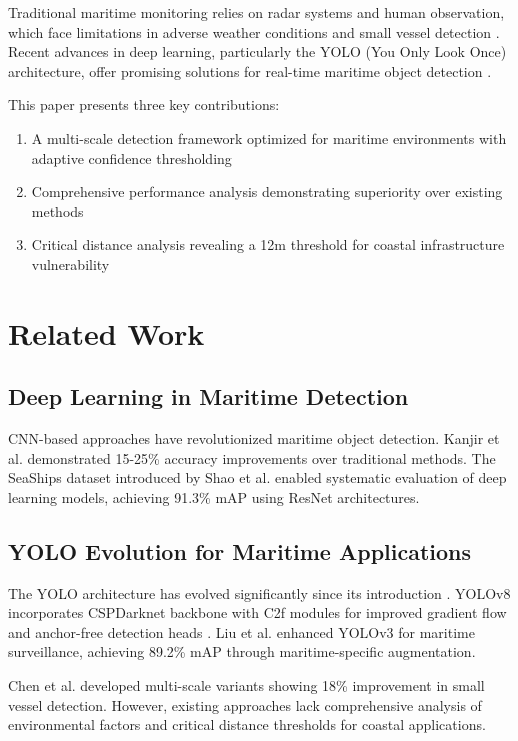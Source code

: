 \documentclass[10pt]{article}
\begin{document}
Traditional maritime monitoring relies on radar systems and human observation, which face limitations in adverse weather conditions and small vessel detection \cite{prasad2017video}. Recent advances in deep learning, particularly the YOLO (You Only Look Once) architecture, offer promising solutions for real-time maritime object detection \cite{liu2021enhanced}.

This paper presents three key contributions:
\begin{enumerate}
\item A multi-scale detection framework optimized for maritime environments with adaptive confidence thresholding
\item Comprehensive performance analysis demonstrating superiority over existing methods
\item Critical distance analysis revealing a 12m threshold for coastal infrastructure vulnerability
\end{enumerate}

\section{Related Work}

\subsection{Deep Learning in Maritime Detection}

CNN-based approaches have revolutionized maritime object detection. Kanjir et al. \cite{kanjir2018vessel} demonstrated 15-25\% accuracy improvements over traditional methods. The SeaShips dataset introduced by Shao et al. \cite{shao2018seaships} enabled systematic evaluation of deep learning models, achieving 91.3\% mAP using ResNet architectures.

\subsection{YOLO Evolution for Maritime Applications}

The YOLO architecture has evolved significantly since its introduction \cite{yolo2016}. YOLOv8 incorporates CSPDarknet backbone with C2f modules for improved gradient flow and anchor-free detection heads \cite{yolov8}. Liu et al. \cite{liu2021enhanced} enhanced YOLOv3 for maritime surveillance, achieving 89.2\% mAP through maritime-specific augmentation.

Chen et al. \cite{chen2020improved} developed multi-scale variants showing 18\% improvement in small vessel detection. However, existing approaches lack comprehensive analysis of environmental factors and critical distance thresholds for coastal applications.
\end{document}
